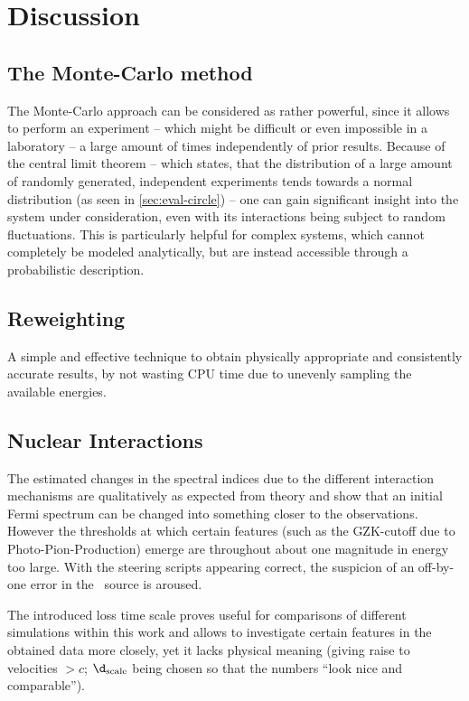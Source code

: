 \section{Discussion}
\subsection{The Monte-Carlo method}
The Monte-Carlo approach can be considered as rather powerful, since it allows
to perform  an experiment -- which might be difficult or even impossible in a
laboratory -- a large amount of times independently of prior results. Because of
the central limit theorem -- which states, that the distribution of a
large amount of randomly generated, independent experiments tends
towards a normal distribution (as seen in \cref{sec:eval-circle}) -- one
can gain significant insight into the system under consideration,
even with its interactions being subject to random fluctuations.
This is particularly helpful for complex systems, which cannot completely be
modeled analytically, but are instead accessible through a probabilistic
description.

\subsection{Reweighting}
\label{sec:dis-rew}
A simple and effective technique to obtain physically appropriate and
consistently accurate results, by not wasting CPU time due to unevenly sampling
the available energies.

\subsection{Nuclear Interactions}
\label{sec:dis-int}
The estimated changes in the spectral indices due to the different interaction
mechanisms are qualitatively as expected from theory and show that an initial
Fermi spectrum can be changed into something closer to the observations.
However the thresholds at which certain features (such as the GZK-cutoff due to
Photo-Pion-Production) emerge are throughout about
one magnitude in energy too large.  With the steering scripts appearing
correct, the suspicion of an off-by-one error in the \CRPropa~source is
aroused.

The introduced loss time scale proves useful for comparisons of different
simulations within this work and allows to investigate certain features in the
obtained data more closely, yet it lacks physical meaning (giving raise to
velocities $>c$; $\d_{\mathrm{scale}}$ being chosen so that the numbers
\enquote{look nice and comparable}).

